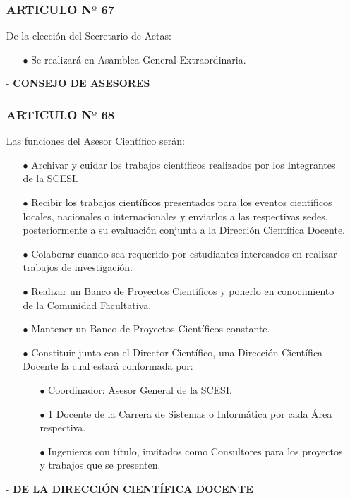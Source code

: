 \documentclass[letterpaper,11pt]{book}
\begin{document}
\begin{itemize}
\subsubsection*{ARTICULO N$º$ 67}
De la elección del Secretario de Actas:
\begin{itemize}
\item[$\bullet$] Se realizará en Asamblea General  Extraordinaria.
\end{itemize}
\item[-] {\bf CONSEJO DE ASESORES}
\subsubsection*{ARTICULO N$º$ 68}
Las funciones del Asesor Científico serán:
\begin{itemize}
\item[$\bullet$] Archivar y cuidar los trabajos científicos realizados por los Integrantes de la SCESI. 
\item[$\bullet$] Recibir los trabajos científicos presentados para los eventos científicos locales, nacionales o internacionales y enviarlos a las respectivas sedes, posteriormente a su evaluación conjunta a la Dirección Científica Docente. 
\item[$\bullet$] Colaborar cuando sea requerido por estudiantes interesados en realizar trabajos de investigación. 
\item[$\bullet$] Realizar un Banco de Proyectos Científicos y ponerlo en conocimiento de la Comunidad Facultativa. 
\item[$\bullet$] Mantener un Banco de Proyectos Científicos constante. 
\item[$\bullet$] Constituir junto con el Director Científico, una Dirección Científica Docente la cual estará conformada por: 
\begin{itemize}
\item[$\bullet$] Coordinador: Asesor General de la SCESI. 
\item[$\bullet$] 1 Docente de la Carrera de Sistemas o Informática por cada Área respectiva. 
\item[$\bullet$] Ingenieros con título, invitados como Consultores para los proyectos y trabajos que se presenten.  
\end{itemize}
\end{itemize}
\item[-] {\bf DE LA DIRECCIÓN CIENTÍFICA DOCENTE}

\end{itemize}
\end{document}
